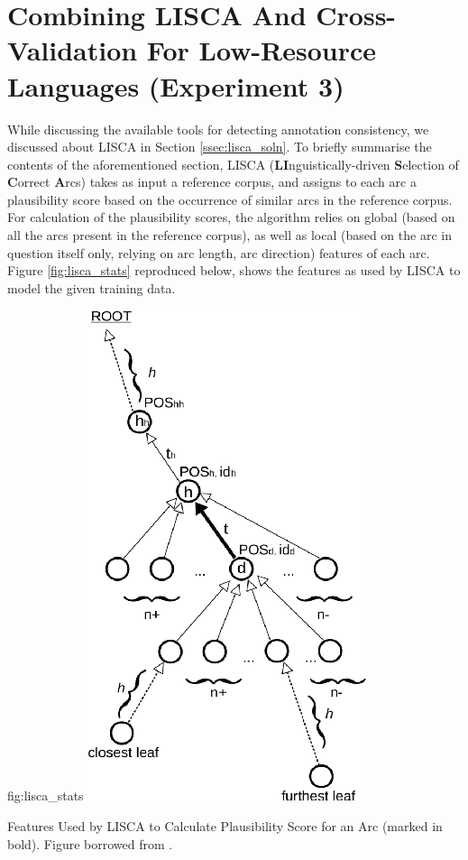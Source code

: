 \chapter{Combining LISCA And Cross-Validation For Low-Resource Languages (Experiment 3)}
\label{chap:lisca}

While discussing the available tools for detecting annotation consistency, we discussed about LISCA \citep{lisca} in Section \ref{ssec:lisca_soln}. To briefly summarise the contents of the aforementioned section, LISCA (\textbf{LI}nguistically-driven \textbf{S}election of \textbf{C}orrect \textbf{A}rcs) takes as input a reference corpus, and assigns to each arc a plausibility score based on the occurrence of similar arcs in the reference corpus. For calculation of the plausibility scores, the algorithm relies on global (based on all the arcs present in the reference corpus), as well as local (based on the arc in question itself only, relying on arc length, arc direction) features of each arc. Figure \ref{fig:lisca_stats} reproduced below, shows the features as used by LISCA to model the given training data.

\begin{reusefigure}[H]{fig:lisca_stats}
    \centering
    \includegraphics[scale=0.5]{img/lisca_stats.png}
    \caption[Features Used by LISCA to Calculate Plausibility Score for an Arc]{Features Used by LISCA to Calculate Plausibility Score for an Arc (marked in bold). Figure borrowed from \cite{alzetta2017dangerous}. }
\end{reusefigure}

